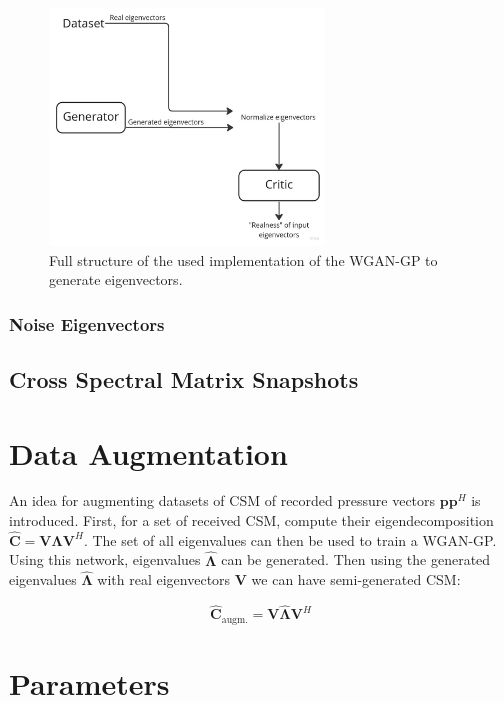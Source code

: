 \documentclass[11pt,a4paper,twoside]{report}
\begin{document}
\begin{figure}
    \centering
    \includegraphics[width=0.65\textwidth]{figs/flowchart_evecs_wgangp.jpg}
    \caption{Full structure of the used implementation of the WGAN-GP to generate eigenvectors.}
    \label{fig:flowchart_evecs_wgangp}
\end{figure}

\subsubsection{Noise Eigenvectors}

\subsection{Cross Spectral Matrix Snapshots}

\section{Data Augmentation}

An idea for augmenting datasets of CSM of recorded pressure vectors $\mathbf{p} \mathbf{p}^H$ is introduced. First, for a set of received CSM, compute their eigendecomposition $\mathbf{\hat{C}} = \mathbf{V} \mathbf{\Lambda} \mathbf{V}^H$. The set of all eigenvalues can then be used to train a WGAN-GP. Using this network, eigenvalues $\hat{\mathbf{\Lambda}}$ can be generated. Then using the generated eigenvalues $\hat{\mathbf{\Lambda}}$ with real eigenvectors $\mathbf{V}$ we can have semi-generated CSM:

\begin{equation}
    \mathbf{\hat{C}}_\text{augm.}  = \mathbf{V} \hat{\mathbf{\Lambda}} \mathbf{V}^H
\end{equation}


\section{Parameters}
\end{document}
